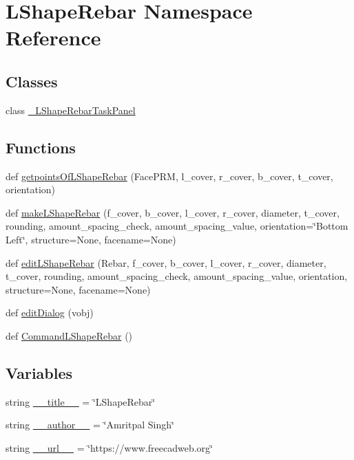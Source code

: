 \hypertarget{namespaceLShapeRebar}{}\section{L\+Shape\+Rebar Namespace Reference}
\label{namespaceLShapeRebar}
\subsection*{Classes}
\begin{DoxyCompactItemize}
\item 
class \hyperlink{classLShapeRebar_1_1__LShapeRebarTaskPanel}{\+\_\+\+L\+Shape\+Rebar\+Task\+Panel}
\end{DoxyCompactItemize}
\subsection*{Functions}
\begin{DoxyCompactItemize}
\item 
def \hyperlink{namespaceLShapeRebar_a3019960c6f6476cb70df9ee06f330dfb}{getpoints\+Of\+L\+Shape\+Rebar} (Face\+P\+RM, l\+\_\+cover, r\+\_\+cover, b\+\_\+cover, t\+\_\+cover, orientation)
\item 
def \hyperlink{namespaceLShapeRebar_a647a28e94933108c6617da8532d76998}{make\+L\+Shape\+Rebar} (f\+\_\+cover, b\+\_\+cover, l\+\_\+cover, r\+\_\+cover, diameter, t\+\_\+cover, rounding, amount\+\_\+spacing\+\_\+check, amount\+\_\+spacing\+\_\+value, orientation=\char`\"{}Bottom Left\char`\"{}, structure=None, facename=None)
\item 
def \hyperlink{namespaceLShapeRebar_a9915291e3457e1c27f556d7903e02486}{edit\+L\+Shape\+Rebar} (Rebar, f\+\_\+cover, b\+\_\+cover, l\+\_\+cover, r\+\_\+cover, diameter, t\+\_\+cover, rounding, amount\+\_\+spacing\+\_\+check, amount\+\_\+spacing\+\_\+value, orientation, structure=None, facename=None)
\item 
def \hyperlink{namespaceLShapeRebar_a73f1b8d577fecf230a8c071424b2015e}{edit\+Dialog} (vobj)
\item 
def \hyperlink{namespaceLShapeRebar_a5439b0c3265fa6d432d4a81e47f4441e}{Command\+L\+Shape\+Rebar} ()
\end{DoxyCompactItemize}
\subsection*{Variables}
\begin{DoxyCompactItemize}
\item 
string \hyperlink{namespaceLShapeRebar_a0ac8e9cb97e560c6ce362c1ac5144c31}{\+\_\+\+\_\+title\+\_\+\+\_\+} = \char`\"{}L\+Shape\+Rebar\char`\"{}
\item 
string \hyperlink{namespaceLShapeRebar_ad398517c2df8a455dfd0b670e54285ea}{\+\_\+\+\_\+author\+\_\+\+\_\+} = \char`\"{}Amritpal Singh\char`\"{}
\item 
string \hyperlink{namespaceLShapeRebar_a7bca929f0dda68928d1f3978b4e877f8}{\+\_\+\+\_\+url\+\_\+\+\_\+} = \char`\"{}https\+://www.\+freecadweb.\+org\char`\"{}
\end{DoxyCompactItemize}


